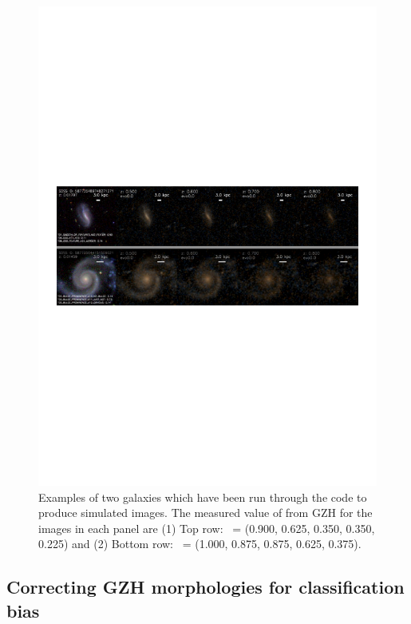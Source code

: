 \documentclass[twocolumn]{aastex6}
\begin{document}
\begin{figure}
\center
\includegraphics[width=160mm]{figures/example_ferengi.pdf}
\caption{Examples of two galaxies which have been run through the \ferengi{} code to produce simulated \hst{} images. The measured value of \pfeatures{} from GZH for the images in each panel are (1) Top row: \pfeatures~= (0.900, 0.625, 0.350, 0.350, 0.225) and (2) Bottom row: \pfeatures~= (1.000, 0.875, 0.875, 0.625, 0.375). \label{fig:exampleFERENGI}}
\end{figure}

\subsection{Correcting GZH morphologies for classification bias}\label{ssec:zeta}
\end{document}
